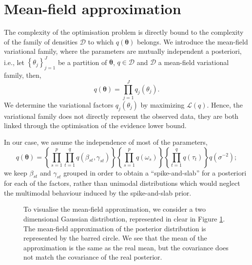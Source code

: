 \documentclass[a4paper, 11pt]{report}
\numberwithin{equation}{chapter}
\begin{document}
\section{Mean-field approximation}
The complexity of the optimisation problem is directly bound to the complexity of the family of densities $\mathcal{D}$ to which $q(\boldsymbol{\theta})$ belongs. We introduce the mean-field variational family, where the parameters are mutually independent a posteriori, i.e., let $\left\lbrace \theta_j\right\rbrace_{j=1}^J$ be a partition of $\boldsymbol{\theta}$, $q \in \mathcal{D}$ and $\mathcal{D}$ a mean-field variational family, then,
\begin{equation*}
q(\boldsymbol{\theta}) = \prod_{j=1}^J q_j(\theta_j).
\end{equation*}
We determine the variational factors $q_j(\theta_j)$ by maximizing $\mathcal{L}(q)$. Hence, the variational family does not directly represent the observed data, they are both linked through the optimisation of the evidence lower bound.

In our case, we assume the independence of most of the parameters,
\begin{equation*}
q(\boldsymbol{\theta}) =\left\lbrace\prod_{s=1}^p \prod_{t=1}^q q(\beta_{st}, \gamma_{st})\right\rbrace \left\lbrace\prod_{s=1}^p  q(\omega_s)\right\rbrace \left\lbrace\prod_{t=1}^q q(\tau_t)\right\rbrace q(\sigma^{-2});
\end{equation*}
we keep $\beta_{st}$ and $\gamma_{st}$ grouped in order to obtain a ``spike-and-slab'' for a posteriori for each of the factors, rather than unimodal distributions which would neglect the multimodal behaviour induced by the spike-and-slab prior.

\begin{figure}[h!]
\centering
{}
\caption{\label{fig:mean_field}To visualise the mean-field approximation, we consider a two dimensional Gaussian distribution, represented in clear in Figure \ref{fig:mean_field}. The mean-field approximation of the posterior distribution is represented by the barred circle. We see that the mean of the approximation is the same as the real mean, but the covariance does not match the covariance of the real posterior.}
\end{figure}
\end{document}
